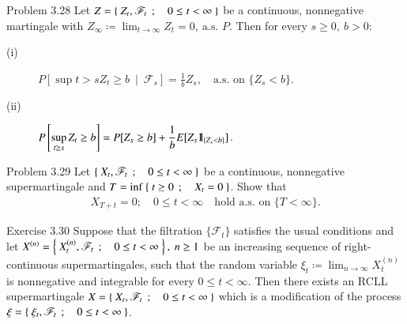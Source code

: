 	\begin{itembox}[l]{Problem 3.28}
		Let $Z = \left\{\ Z_t,\mathscr{F}_t\ \, ; \quad 0 \leq t < \infty\ \right\}$ be a continuous, nonnegative martingale with
		$Z_\infty \coloneqq \lim_{t \to \infty} Z_t = 0,\ \mbox{a.s. $P$}$. Then for every $s \geq 0,\ b > 0$:
		\begin{description}
			\item[(i)] $\displaystyle P\left[ \sup{t>s}{Z_t \geq b}\ \middle|\ \mathscr{F}_s \right] = \frac{1}{b} Z_s,
				\quad \mbox{a.s. on $\{Z_s < b\}$}$.
			\item[(ii)] $\displaystyle P\left[ \operatorname*{sup}_{t \geq s} Z_t \geq b \right] = P[Z_s \geq b] + \frac{1}{b} E[Z_s \mbox{1}\hspace{-0.25em}\mbox{l}_{\{Z_s < b\}}]$.
		\end{description}
	\end{itembox}
	
	\begin{itembox}[l]{Problem 3.29}
		Let $\left\{\ X_t,\mathscr{F}_t\ \, ; \quad 0 \leq t < \infty\ \right\}$ be a continuous, nonnegative supermartingale
		and $T = \operatorname*{inf}_{} \left\{\ t \geq 0\ \, ; \quad X_t = 0\ \right\}$. Show that
		\begin{align}
			X_{T + t} = 0; \quad 0 \leq t < \infty \quad \mbox{hold a.s. on $\{T < \infty\}$}.
		\end{align}
	\end{itembox}
	
	\begin{itembox}[l]{Exercise 3.30}
		Suppose that the filtration $\{\mathscr{F}_t\}$ satisfies the usual conditions and let 
		$X^{(n)} = \left\{\ X^{(n)}_t,\mathscr{F}_t\ \, ; \quad 0 \leq t < \infty\ \right\},\ n \geq 1$ be an increasing sequence
		of right-continuous supermartingales, such that the random variable $\xi_t \coloneqq \lim_{n \to \infty} X^{(n)}_t$
		is nonnegative and integrable for every $0 \leq t < \infty$. Then there exists an RCLL supermartingale
		$X = \left\{\ X_t,\mathscr{F}_t\ \, ; \quad 0 \leq t < \infty\ \right\}$ which is a modification of the process 
		$\xi = \left\{\ \xi_t,\mathscr{F}_t\ \, ; \quad 0 \leq t < \infty\ \right\}$.
	\end{itembox}